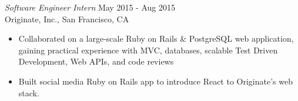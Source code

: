 {\sl Software Engineer Intern} \hfill May 2015 - Aug 2015 \\
Originate, Inc., San Francisco, CA
\begin{itemize} \itemsep -2pt %
  \item Collaborated on a large-scale Ruby on Rails \& PostgreSQL web
          application, gaining practical experience with MVC, databases,
          scalable Test Driven Development, Web APIs, and code reviews
  \item Built social media Ruby on Rails app to introduce React to Originate's
          web stack.
\end{itemize}
